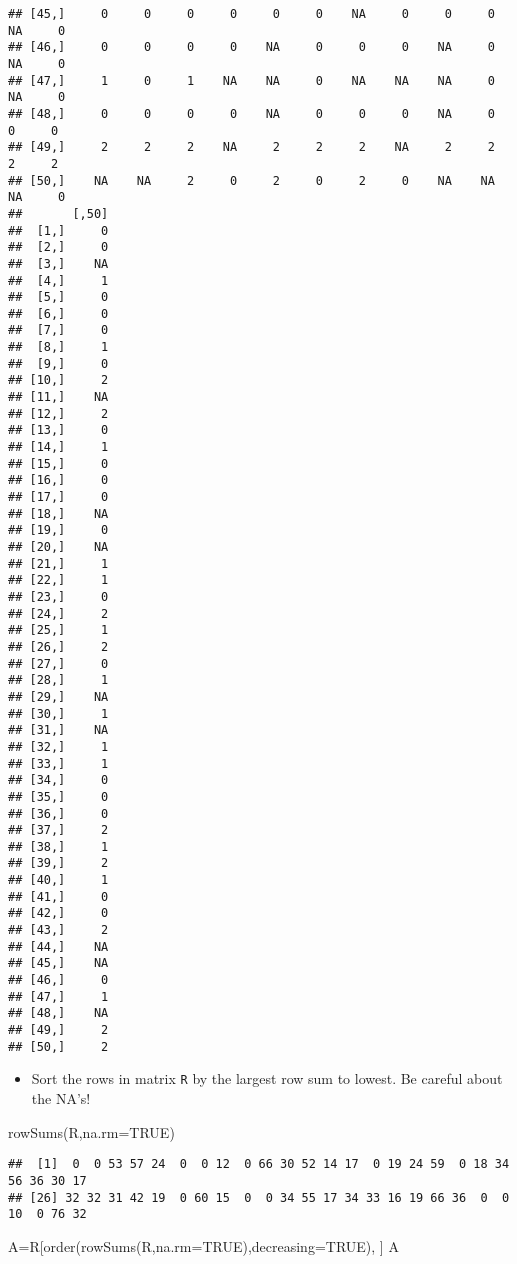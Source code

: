 \documentclass[
]{article}
\newenvironment{Shaded}{\begin{snugshade}}{\end{snugshade}}
\newcommand{\AttributeTok}[1]{\textcolor[rgb]{0.77,0.63,0.00}{#1}}
\newcommand{\ConstantTok}[1]{\textcolor[rgb]{0.00,0.00,0.00}{#1}}
\newcommand{\FunctionTok}[1]{\textcolor[rgb]{0.00,0.00,0.00}{#1}}
\newcommand{\NormalTok}[1]{#1}
\newcommand{\OtherTok}[1]{\textcolor[rgb]{0.56,0.35,0.01}{#1}}
\providecommand{\tightlist}{%
  \setlength{\itemsep}{0pt}\setlength{\parskip}{0pt}}
\begin{document}
\begin{verbatim}
## [45,]     0     0     0     0     0     0    NA     0     0     0    NA     0
## [46,]     0     0     0     0    NA     0     0     0    NA     0    NA     0
## [47,]     1     0     1    NA    NA     0    NA    NA    NA     0    NA     0
## [48,]     0     0     0     0    NA     0     0     0    NA     0     0     0
## [49,]     2     2     2    NA     2     2     2    NA     2     2     2     2
## [50,]    NA    NA     2     0     2     0     2     0    NA    NA    NA     0
##       [,50]
##  [1,]     0
##  [2,]     0
##  [3,]    NA
##  [4,]     1
##  [5,]     0
##  [6,]     0
##  [7,]     0
##  [8,]     1
##  [9,]     0
## [10,]     2
## [11,]    NA
## [12,]     2
## [13,]     0
## [14,]     1
## [15,]     0
## [16,]     0
## [17,]     0
## [18,]    NA
## [19,]     0
## [20,]    NA
## [21,]     1
## [22,]     1
## [23,]     0
## [24,]     2
## [25,]     1
## [26,]     2
## [27,]     0
## [28,]     1
## [29,]    NA
## [30,]     1
## [31,]    NA
## [32,]     1
## [33,]     1
## [34,]     0
## [35,]     0
## [36,]     0
## [37,]     2
## [38,]     1
## [39,]     2
## [40,]     1
## [41,]     0
## [42,]     0
## [43,]     2
## [44,]    NA
## [45,]    NA
## [46,]     0
## [47,]     1
## [48,]    NA
## [49,]     2
## [50,]     2
\end{verbatim}

\begin{itemize}
\tightlist
\item
  Sort the rows in matrix \texttt{R} by the largest row sum to lowest.
  Be careful about the NA's!
\end{itemize}

\begin{Shaded}
\begin{Highlighting}[]
\FunctionTok{rowSums}\NormalTok{(R,}\AttributeTok{na.rm=}\ConstantTok{TRUE}\NormalTok{)}
\end{Highlighting}
\end{Shaded}

\begin{verbatim}
##  [1]  0  0 53 57 24  0  0 12  0 66 30 52 14 17  0 19 24 59  0 18 34 56 36 30 17
## [26] 32 32 31 42 19  0 60 15  0  0 34 55 17 34 33 16 19 66 36  0  0 10  0 76 32
\end{verbatim}

\begin{Shaded}
\begin{Highlighting}[]
\NormalTok{A}\OtherTok{=}\NormalTok{R[}\FunctionTok{order}\NormalTok{(}\FunctionTok{rowSums}\NormalTok{(R,}\AttributeTok{na.rm=}\ConstantTok{TRUE}\NormalTok{),}\AttributeTok{decreasing=}\ConstantTok{TRUE}\NormalTok{), ]}
\NormalTok{A}
\end{Highlighting}
\end{Shaded}
\end{document}
